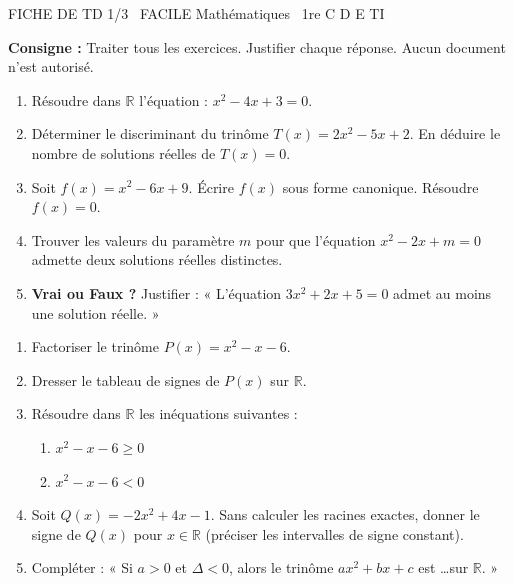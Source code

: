 \documentclass[11pt]{article}
\begin{document}
\begin{tcolorbox}[enhanced,colback=popink,colframe=popink,arc=10pt,boxrule=0pt,left=12pt,right=12pt,top=9pt,bottom=9pt]
{\color{white}\popxbold\small FICHE DE TD 1/3 \textbullet\ FACILE \hfill Mathématiques \textbullet\ 1re C D E TI\par}
\end{tcolorbox}
\vspace{4pt}
\noindent\textbf{Consigne :} Traiter tous les exercices. Justifier chaque réponse. Aucun document n'est autorisé.

\begin{exercice}
\begin{enumerate}
    \item Résoudre dans $\mathbb{R}$ l'équation : $x^2 - 4x + 3 = 0$.
    \item Déterminer le discriminant du trinôme $T(x) = 2x^2 - 5x + 2$. En déduire le nombre de solutions réelles de $T(x)=0$.
    \item Soit $f(x) = x^2 - 6x + 9$. Écrire $f(x)$ sous forme canonique. Résoudre $f(x) = 0$.
    \item Trouver les valeurs du paramètre $m$ pour que l'équation $x^2 - 2x + m = 0$ admette deux solutions réelles distinctes.
    \item \textbf{Vrai ou Faux ?} Justifier : « L'équation $3x^2 + 2x + 5 = 0$ admet au moins une solution réelle. »
\end{enumerate}
\end{exercice}

\begin{exercice}
\begin{enumerate}
    \item Factoriser le trinôme $P(x) = x^2 - x - 6$.
    \item Dresser le tableau de signes de $P(x)$ sur $\mathbb{R}$.
    \item Résoudre dans $\mathbb{R}$ les inéquations suivantes :
    \begin{enumerate}
        \item $x^2 - x - 6 \geqslant 0$
        \item $x^2 - x - 6 < 0$
    \end{enumerate}
    \item Soit $Q(x) = -2x^2 + 4x - 1$. Sans calculer les racines exactes, donner le signe de $Q(x)$ pour $x \in \mathbb{R}$ (préciser les intervalles de signe constant).
    \item Compléter : « Si $a > 0$ et $\Delta < 0$, alors le trinôme $ax^2+bx+c$ est \ldots sur $\mathbb{R}$. »
\end{enumerate}
\end{exercice}
\end{document}

